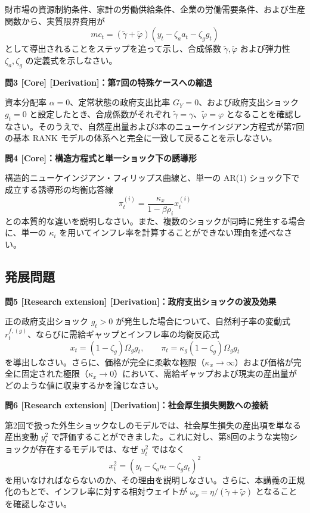 \documentclass[
  japanese,
  lualatex,
  ja=standard,
  12pt,
  a4paper]{ltjsarticle}
\begin{document}
財市場の資源制約条件、家計の労働供給条件、企業の労働需要条件、および生産関数から、実質限界費用が
\[
mc_t
=
(\tilde{\gamma}+\tilde{\varphi})
\left(y_t-\zeta_a a_t-\zeta_g g_t\right)
\] として導出されることをステップを追って示し、合成係数
\(\tilde{\gamma}, \tilde{\varphi}\) および弾力性 \(\zeta_a, \zeta_g\)
の定義式を示しなさい。

\Needspace{0.23\textheight}

\textbf{問3 {[}Core{]} {[}Derivation{]}：第7回の特殊ケースへの縮退}

資本分配率 \(\alpha=0\)、定常状態の政府支出比率
\(G_Y=0\)、および政府支出ショック \(g_t=0\)
と設定したとき、合成係数がそれぞれ
\(\tilde{\gamma}=\gamma\)、\(\tilde{\varphi}=\varphi\)
となることを確認しなさい。そのうえで、自然産出量および3本のニューケインジアン方程式が第7回の基本
RANK モデルの体系へと完全に一致して戻ることを示しなさい。

\Needspace{0.25\textheight}

\textbf{問4 {[}Core{]}：構造方程式と単一ショック下の誘導形}

構造的ニューケインジアン・フィリップス曲線と、単一の AR(1)
ショック下で成立する誘導形の均衡応答線 \[
\pi_t^{(i)}
=
\frac{\kappa_x}{1-\beta\rho_i}x_t^{(i)}
\]
との本質的な違いを説明しなさい。また、複数のショックが同時に発生する場合に、単一の
\(\kappa_i\)
を用いてインフレ率を計算することができない理由を述べなさい。

\Needspace{0.28\textheight}

\subsection{発展問題}\label{ux767aux5c55ux554fux984c}

\textbf{問5 {[}Research extension{]}
{[}Derivation{]}：政府支出ショックの波及効果}

正の政府支出ショック \(g_t>0\)
が発生した場合について、自然利子率の変動式
\(r_t^{f,(g)}\)、ならびに需給ギャップとインフレ率の均衡反応式 \[
x_t=(1-\zeta_g)\Omega_g g_t,
\qquad
\pi_t=\kappa_g(1-\zeta_g)\Omega_g g_t
\]
を導出しなさい。さらに、価格が完全に柔軟な極限（\(\kappa_x\to\infty\)）および価格が完全に固定された極限（\(\kappa_x\to0\)）において、需給ギャップおよび現実の産出量がどのような値に収束するかを論じなさい。

\Needspace{0.28\textheight}

\textbf{問6 {[}Research extension{]}
{[}Derivation{]}：社会厚生損失関数への接続}

第2回で扱った外生ショックなしのモデルでは、社会厚生損失の産出項を単なる産出変動
\(y_t^2\)
で評価することができました。これに対し、第8回のような実物ショックが存在するモデルでは、なぜ
\(y_t^2\) ではなく \[
x_t^2
=
\left(y_t-\zeta_a a_t-\zeta_g g_t\right)^2
\]
を用いなければならないのか、その理由を説明しなさい。さらに、本講義の正規化のもとで、インフレ率に対する相対ウェイトが
\(\omega_p=\eta/(\tilde{\gamma}+\tilde{\varphi})\)
となることを確認しなさい。
\end{document}
